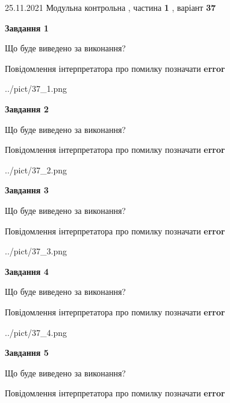 \documentclass[10pt, ukrainian]{article}
\begin{document}
{25.11.2021 Модульна контрольна , частина \textbf { 1 }, варіант  \No \textbf { 37 }\par}
{
\begin {large}

{\begin {center}\textbf{Завдання 1}\end {center}}\par
Що буде виведено за виконання? \par
Повідомлення інтерпретатора про помилку позначати \textbf{error}

\begin{center}
	{../pict/37_1.png}
\end{center}
\newpage

{\begin {center}\textbf{Завдання 2}\end {center}}\par
Що буде виведено за виконання? \par
Повідомлення інтерпретатора про помилку позначати \textbf{error}

\begin{center}
	{../pict/37_2.png}
\end{center}
\newpage

{\begin {center}\textbf{Завдання 3}\end {center}}\par
Що буде виведено за виконання? \par
Повідомлення інтерпретатора про помилку позначати \textbf{error}

\begin{center}
	{../pict/37_3.png}
\end{center}
\newpage

{\begin {center}\textbf{Завдання 4}\end {center}}\par
Що буде виведено за виконання? \par
Повідомлення інтерпретатора про помилку позначати \textbf{error}

\begin{center}
	{../pict/37_4.png}
\end{center}
\newpage

{\begin {center}\textbf{Завдання 5}\end {center}}\par
Що буде виведено за виконання? \par
Повідомлення інтерпретатора про помилку позначати \textbf{error}


\end{large}}
\end{document}
